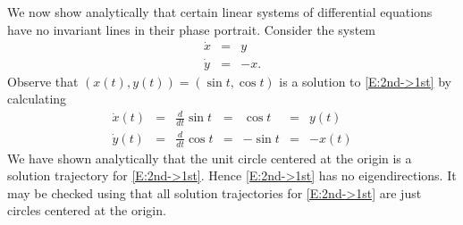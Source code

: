 \documentclass{ximera}
\begin{document}
We now show analytically that certain linear systems of
differential equations have no invariant lines in their phase portrait.
Consider the system
\begin{equation}  \label{E:2nd->1st}
\begin{array}{rcl}
\dot{x} & = & y \\
\dot{y} & = & -x.
\end{array}
\end{equation}
Observe that $(x(t),y(t))=(\sin t, \cos t)$ is a solution to \eqref{E:2nd->1st} by calculating
\[
\begin{array}{rclcrcr}
\dot x(t) & = & \frac{d}{dt} \sin t & = & \cos t & = & y(t)\\
\dot y(t) & = & \frac{d}{dt} \cos t&  = & -\sin t & = & -x(t)
\end{array}
\]
We have shown analytically that the unit circle centered at the origin is a solution 
trajectory for \eqref{E:2nd->1st}.  Hence \eqref{E:2nd->1st} has no 
eigendirections.  It may be checked using \Matlab that all solution 
trajectories for \eqref{E:2nd->1st} are just circles centered at the origin.




\end{document}
